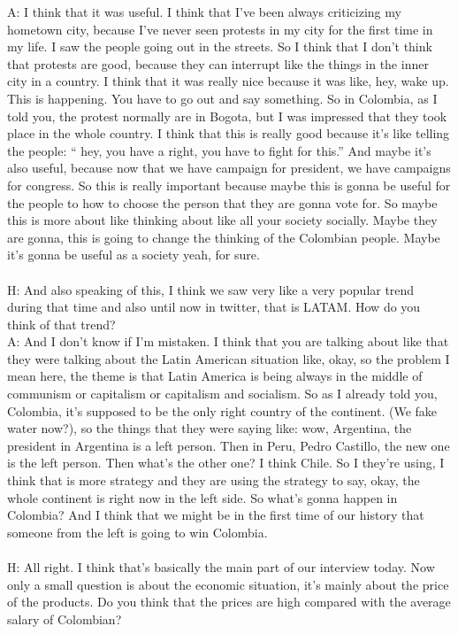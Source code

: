 \documentclass{phyasgn}\usepackage{nag}
\begin{document}
A: I think that it was useful. I think that I've been always criticizing my hometown city, because I've never seen protests in my city for the first time in my life. I saw the people going out in the streets. So I think that I don't think that protests are good, because they can interrupt like the things in the inner city in a country. I think that it was really nice because it was like, hey, wake up. This is happening. You have to go out and say something. So in Colombia, as I told you, the protest normally are in Bogota, but I was impressed that they took place in the whole country. I think that this is really good because it's like telling the people: “ hey, you have a right, you have to fight for this.” And maybe it’s also useful, because now that we have campaign for president, we have campaigns for congress. So this is really important because maybe this is gonna be useful for the people to how to choose the person that they are gonna vote for. So maybe this is more about like thinking about like all your society socially. Maybe they are gonna, this is going to change the thinking of the Colombian people. Maybe it's gonna be useful as a society yeah, for sure.\\
\\
H: And also speaking of this, I think we saw very like a very popular trend during that time and also until now in twitter, that is LATAM. How do you think of that trend?\\
A: And I don't know if I'm mistaken. I think that you are talking about like that they were talking about the Latin American situation like, okay, so the problem I mean here, the theme is that Latin America is being always in the middle of communism or capitalism or capitalism and socialism. So as I already told you, Colombia, it's supposed to be the only right country of the continent. (We fake water now?), so the things that they were saying like: wow, Argentina, the president in Argentina is a left person. Then in Peru, Pedro Castillo, the new one is the left person. Then what's the other one? I think Chile. So I they're using, I think that is more strategy and they are using the strategy to say, okay, the whole continent is right now in the left side. So what's gonna happen in Colombia? And I think that we might be in the first time of our history that someone from the left is going to win Colombia.\\
\\
H: All right. I think that's basically the main part of our interview today. Now only a small question is about the economic situation, it's mainly about the price of the products. Do you think that the prices are high compared with the average salary of Colombian?\\
\end{document}
